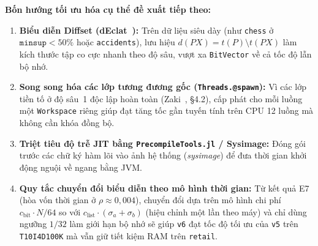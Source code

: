 \textbf{Bốn hướng tối ưu hóa cụ thể đề xuất tiếp theo:}
\begin{enumerate}
    \item \textbf{Biểu diễn Diffset (dEclat~\cite{zaki2003fast}):} Trên dữ liệu siêu dày (như \texttt{chess} ở $\texttt{minsup} < 50\%$ hoặc \texttt{accidents}), lưu hiệu $d(PX) = t(P) \setminus t(PX)$ làm kích thước tập co cực nhanh theo độ sâu, vượt xa \texttt{BitVector} về cả tốc độ lẫn bộ nhớ.
    \item \textbf{Song song hóa các lớp tương đương gốc (\texttt{Threads.@spawn}):} Vì các lớp tiền tố ở độ sâu~1 độc lập hoàn toàn (Zaki~\cite{zaki2000scalable}, §4.2), cấp phát cho mỗi luồng một \texttt{Workspace} riêng giúp đạt tăng tốc gần tuyến tính trên CPU 12 luồng mà không cần khóa đồng bộ.
    \item \textbf{Triệt tiêu độ trễ JIT bằng \texttt{PrecompileTools.jl} / Sysimage:} Đóng gói trước các chữ ký hàm lõi vào ảnh hệ thống (\emph{sysimage}) để đưa thời gian khởi động nguội về ngang bằng JVM.
    \item \textbf{Quy tắc chuyển đổi biểu diễn theo mô hình thời gian:} Từ kết quả E7 (hòa vốn thời gian ở $\rho \approx 0{,}004$), chuyển đổi dựa trên mô hình chi phí $c_{\text{bit}} \cdot N/64$ so với $c_{\text{list}} \cdot (\sigma_a + \sigma_b)$ (hiệu chỉnh một lần theo máy) và chỉ dùng ngưỡng $1/32$ làm giới hạn bộ nhớ sẽ giúp \texttt{v6} đạt tốc độ tối ưu của \texttt{v5} trên \texttt{T10I4D100K} mà vẫn giữ tiết kiệm RAM trên \texttt{retail}.
\end{enumerate}
